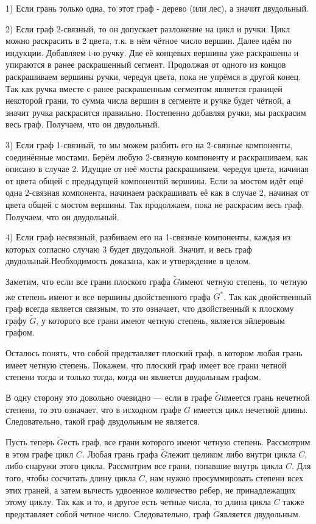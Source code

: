 \documentclass[a4paper,12pt]{article}
\numberwithin{figure}{section}
\def\Gwave{$\tilde{G}$}
\begin{document}
\begin{solution}
	1) Если грань только одна, то этот граф - дерево (или лес), а значит двудольный.
	
	2) Если граф 2-связный, то он допускает разложение на цикл и ручки. Цикл можно раскрасить в 2 цвета, т.к. в нём чётное число вершин. Далее идём по индукции. Добавляем i-ю ручку. Две её концевых вершины уже раскрашены и упираются в ранее раскрашенный сегмент. Продолжая от одного из концов раскрашиваем вершины ручки, чередуя цвета, пока не упрёмся в другой конец. Так как ручка вместе с ранее раскрашенным сегментом является границей некоторой грани, то сумма числа вершин в сегменте и ручке будет чётной, а значит ручка раскрасится правильно. Постепенно добавляя ручки, мы раскрасим весь граф. Получаем, что он двудольный.
	
	3) Если граф 1-связный, то мы можем разбить его на 2-связные компоненты, соединённые мостами. Берём любую 2-связную компоненту и раскрашиваем, как описано в случае 2. Идущие от неё мосты раскрашиваем, чередуя цвета, начиная от цвета общей с предыдущей компонентой вершины. Если за мостом идёт ещё одна 2-связная компонента, начинаем раскрашивать её как в случае 2, начиная от цвета общей с мостом вершины. Так продолжаем, пока не раскрасим весь граф. Получаем, что он двудольный.
	
	4) Если граф несвязный, разбиваем его на 1-связные компоненты, каждая из которых согласно случаю 3 будет двудольной. Значит, и весь граф двудольный.Необходимость доказана, как и утверждение в целом.
\end{solution}

\begin{solution}[Эталонное]
	Заметим, что если все грани плоского графа \Gwave имеют четную степень, то четную же степень имеют и все вершины двойственного графа $\tilde{G^*}$. Так как двойственный граф всегда является связным, то это означает, что двойственный к плоскому графу \Gwave, у которого все грани имеют четную степень, является эйлеровым графом. 
	
	Осталось понять, что собой представляет плоский граф, в котором любая грань имеет четную степень. Покажем, что плоский граф имеет все грани четной степени тогда и только тогда, когда он является двудольным графом.
	
	В одну сторону это довольно очевидно --- если в графе \Gwave имеется грань нечетной степени, то это означает, что в исходном графе $G$ имеется цикл нечетной длины. Следовательно, такой граф двудольным не является.
	
	Пусть теперь \Gwave есть граф, все грани которого имеют четную степень. Рассмотрим в этом графе цикл $C$. Любая грань графа \Gwave лежит целиком либо внутри цикла $C$, либо снаружи этого цикла. Рассмотрим все грани, попавшие внутрь цикла $C$. Для того, чтобы сосчитать длину цикла $C$, нам нужно просуммировать степени всех этих граней, а затем вычесть удвоенное количество ребер, не принадлежащих этому циклу. Так как и то, и другое есть четные числа, то длина цикла $C$ также представляет собой четное число. Следовательно, граф \Gwave является двудольным.
\end{solution}
\end{document}
